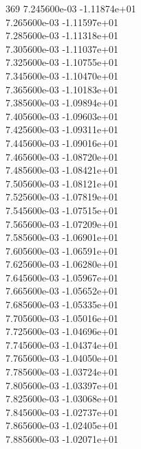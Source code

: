369	7.245600e-03	-1.11874e+01	\\ 	7.265600e-03	-1.11597e+01	\\ 	7.285600e-03	-1.11318e+01	\\ 	7.305600e-03	-1.11037e+01	\\ 	7.325600e-03	-1.10755e+01	\\ 	7.345600e-03	-1.10470e+01	\\ 	7.365600e-03	-1.10183e+01	\\ 	7.385600e-03	-1.09894e+01	\\ 	7.405600e-03	-1.09603e+01	\\ 	7.425600e-03	-1.09311e+01	\\ 	7.445600e-03	-1.09016e+01	\\ 	7.465600e-03	-1.08720e+01	\\ 	7.485600e-03	-1.08421e+01	\\ 	7.505600e-03	-1.08121e+01	\\ 	7.525600e-03	-1.07819e+01	\\ 	7.545600e-03	-1.07515e+01	\\ 	7.565600e-03	-1.07209e+01	\\ 	7.585600e-03	-1.06901e+01	\\ 	7.605600e-03	-1.06591e+01	\\ 	7.625600e-03	-1.06280e+01	\\ 	7.645600e-03	-1.05967e+01	\\ 	7.665600e-03	-1.05652e+01	\\ 	7.685600e-03	-1.05335e+01	\\ 	7.705600e-03	-1.05016e+01	\\ 	7.725600e-03	-1.04696e+01	\\ 	7.745600e-03	-1.04374e+01	\\ 	7.765600e-03	-1.04050e+01	\\ 	7.785600e-03	-1.03724e+01	\\ 	7.805600e-03	-1.03397e+01	\\ 	7.825600e-03	-1.03068e+01	\\ 	7.845600e-03	-1.02737e+01	\\ 	7.865600e-03	-1.02405e+01	\\ 	7.885600e-03	-1.02071e+01	\\ \hline
